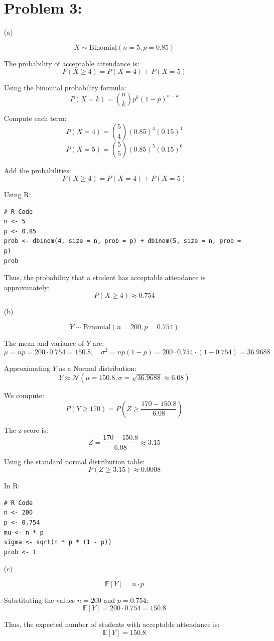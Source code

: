\documentclass{article}
\begin{document}
\begin{enumerate}
\section*{Problem 3:}
\item[(a)]

\[
X \sim \text{Binomial}(n = 5, p = 0.85)
\]

The probability of acceptable attendance is:
\[
P(X \geq 4) = P(X = 4) + P(X = 5)
\]

Using the binomial probability formula:
\[
P(X = k) = \binom{n}{k} p^k (1-p)^{n-k}
\]

Compute each term:
\[
P(X = 4) = \binom{5}{4} (0.85)^4 (0.15)^1
\]
\[
P(X = 5) = \binom{5}{5} (0.85)^5 (0.15)^0
\]

Add the probabilities:
\[
P(X \geq 4) = P(X = 4) + P(X = 5)
\]

Using R:

\begin{verbatim}
# R Code
n <- 5
p <- 0.85
prob <- dbinom(4, size = n, prob = p) + dbinom(5, size = n, prob = p)
prob
\end{verbatim}

Thus, the probability that a student has acceptable attendance is approximately:
\[
P(X \geq 4) \approx 0.754
\]

    \item[(b)]

\[
Y \sim \text{Binomial}(n = 200, p = 0.754)
\]

The mean and variance of $Y$ are:
\[
\mu = np = 200 \cdot 0.754 = 150.8, \quad \sigma^2 = np(1-p) = 200 \cdot 0.754 \cdot (1 - 0.754) = 36.9688
\]

Approximating $Y$ as a Normal distribution:
\[
Y \approx \mathcal{N}(\mu = 150.8, \sigma = \sqrt{36.9688} \approx 6.08)
\]

We compute:
\[
P(Y \geq 170) = P\left(Z \geq \frac{170 - 150.8}{6.08}\right)
\]

The z-score is:
\[
Z = \frac{170 - 150.8}{6.08} \approx 3.15
\]

Using the standard normal distribution table:
\[
P(Z \geq 3.15) \approx 0.0008
\]

In R:

\begin{verbatim}
# R Code
n <- 200
p <- 0.754
mu <- n * p
sigma <- sqrt(n * p * (1 - p))
prob <- 1

\end{verbatim}

\item[(c)]

\[
\mathbb{E}[Y] = n \cdot p
\]

Substituting the values $n = 200$ and $p = 0.754$:
\[
\mathbb{E}[Y] = 200 \cdot 0.754 = 150.8
\]

Thus, the expected number of students with acceptable attendance is:
\[
\mathbb{E}[Y] = 150.8
\]

\end{enumerate}
\end{document}
